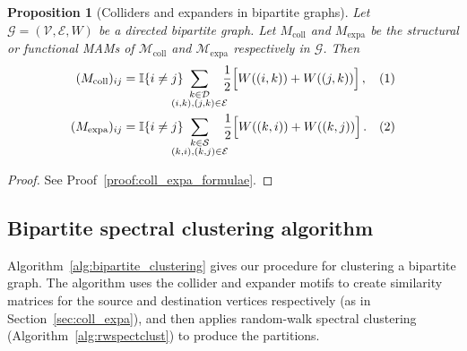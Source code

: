 \documentclass[12pt,draft]{ociamthesis}
\theoremstyle{plain}
\newtheorem{proposition}{Proposition}[chapter]
\theoremstyle{definition}
\theoremstyle{remark}
\newcommand\bb[1]{\mathbb{#1}}
\newcommand\ca[1]{\mathcal{#1}}
\begin{document}
\begin{proposition}[Colliders and expanders in bipartite graphs]
  \label{prop:coll_expa_formulae}
  Let $\ca{G} = (\ca{V,E},W)$ be a directed bipartite graph. Let
  $M_\mathrm{coll}$ and $M_\mathrm{expa}$ be the structural or functional MAMs
  of $\ca{M}_\mathrm{coll}$ and $\ca{M}_\mathrm{expa}$ respectively in
  $\ca{G}$. Then
  \begin{align*}
    (M_\mathrm{coll})_{i j} &= \bb{I} \{i \neq j\} \hspace*{-0.4cm}
    \sum_{\substack{k \in \ca{D} \\ (i,k), (j,k) \in \ca{E}}} \hspace*{-0.2cm}
    \frac{1}{2} \Big[ W((i,k)) + W((j,k)) \Big]\,, &(1)\\
    (M_\mathrm{expa})_{i j} &= \bb{I} \{i \neq j\} \hspace*{-0.4cm}
    \sum_{\substack{k \in \ca{S} \\ (k,i), (k,j) \in \ca{E}}}
    \hspace*{-0.2cm}\frac{1}{2} \Big[ W((k,i)) + W((k,j)) \Big]\,. &(2)
  \end{align*}
\end{proposition}
%
\begin{proof}
  See Proof~\ref{proof:coll_expa_formulae}.
\end{proof}

\subsection{Bipartite spectral clustering algorithm}

Algorithm~\ref{alg:bipartite_clustering} gives our procedure for clustering a
bipartite graph. The algorithm uses the collider and expander motifs to create
similarity matrices for the source and destination vertices respectively (as in
Section~\ref{sec:coll_expa}), and then applies random-walk spectral clustering
(Algorithm~\ref{alg:rwspectclust}) to produce the partitions.
\end{document}
